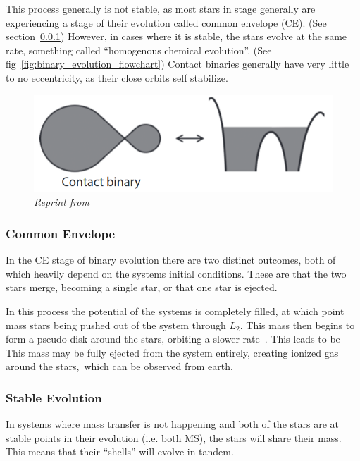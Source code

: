\documentclass[12pt, letterpaper]{article}
\begin{document}
        This process generally is not stable, as most stars in stage generally are experiencing a stage of their evolution called common envelope (CE). (See section~\ref{CommonEnvelope}) However, in cases where it is stable, the stars evolve at the same rate, something called ``homogenous chemical evolution''. (See fig~\ref{fig:binary_evolution_flowchart}) Contact binaries generally have very little to no eccentricity, as their close orbits self stabilize.~\cite{TaurisvandenHeuvel+2023}
        
        \begin{figure}  
            \centering
            \includegraphics[scale = .4]{Figs/Conact Binary.png}

            \caption{\textit{Reprint from~\cite{TaurisvandenHeuvel+2023}}}
            \label{ContactBinaryRL}
        \end{figure}
        
        \subsubsection{Common Envelope}\label{CommonEnvelope}
            In the CE stage of binary evolution there are two distinct outcomes, both of which heavily depend on the systems initial conditions. These are that the two stars merge, becoming a single star, or that one star is ejected. 

            In this process the potential of the systems is completely filled, at which point mass stars being pushed out of the system through $L_2$. This mass then begins to form a pseudo disk around the stars, orbiting a slower rate~\cite{TaurisvandenHeuvel+2023}. This leads to be  This mass may be fully ejected from the system entirely, creating ionized gas around the stars,~\cite{TaurisvandenHeuvel+2023}which can be observed from earth. 

        \subsubsection{Stable Evolution}\label{StableEvoluton}
            In systems where mass transfer is not happening and both of the stars are at stable points in their evolution (i.e. both MS), the stars will share their mass. This means that their ``shells'' will evolve in tandem.
\end{document}
